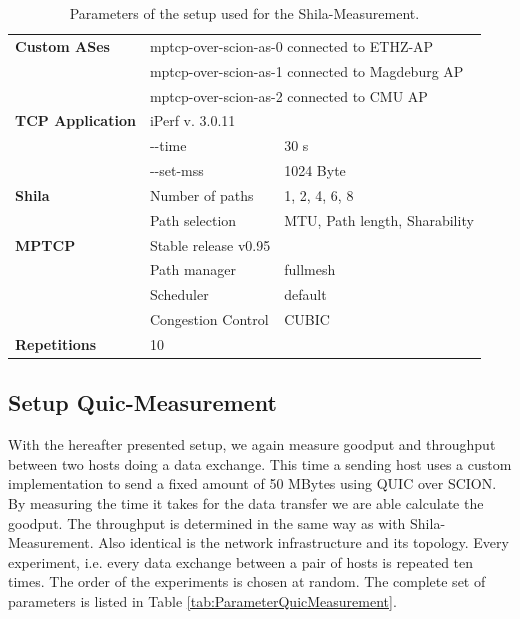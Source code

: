 \begin{table} [H]
	\centering
	\begin{tabular}{lll} 
		\toprule
		\textbf{Custom ASes} 		& \multicolumn{2}{l}{mptcp-over-scion-as-0 connected to ETHZ-AP}				\\
							 		& \multicolumn{2}{l}{mptcp-over-scion-as-1 connected to Magdeburg AP}			\\
							 		& \multicolumn{2}{l}{mptcp-over-scion-as-2 connected to CMU AP}					\smallskip \\ 
		\textbf{TCP Application}	& iPerf v. 3.0.11								&								\\
									& -\vspace{0 px}-time										& 30 s				\\
									& -\vspace{0 px}-set-mss										& 1024 Byte		\smallskip	\\
		\textbf{Shila}				&  Number of paths								& 1, 2, 4, 6, 8					\\
									& Path selection				 				& MTU, Path length, Sharability \smallskip\\
		\textbf{MPTCP}				& Stable release v0.95							&								\\
									& Path manager									& fullmesh						\\
									& Scheduler										& default						\\
									& Congestion Control							& CUBIC							\smallskip\\
		\textbf{Repetitions} 		& 10  											&								\\
		\bottomrule
	\end{tabular}
	\caption{Parameters of the setup used for the Shila-Measurement.}
	\label{tab:ParameterShilaMeasurement}
\end{table}

\subsection*{Setup Quic-Measurement}

With the hereafter presented setup, we again measure goodput and throughput between two hosts doing a data exchange. This time a sending host uses a custom implementation to send a fixed amount of 50 MBytes using QUIC over SCION. By measuring the time it takes for the data transfer we are able calculate the goodput. The throughput is determined in the same way as with Shila-Measurement. Also identical is the network infrastructure and its topology. Every experiment, i.e. every data exchange between a pair of hosts is repeated ten times. The order of the experiments is chosen at random. The complete set of parameters is listed in Table \ref{tab:ParameterQuicMeasurement}.

